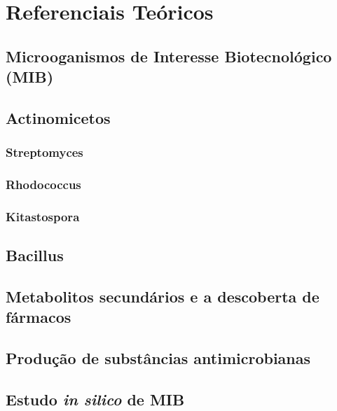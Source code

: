 \chapter{Referenciais Teóricos}
\label{cap:referenciais_teoricos}

\section{Microoganismos de Interesse Biotecnológico (MIB)}

\section{Actinomicetos}
\subsection{Streptomyces}
\subsection{Rhodococcus}
\subsection{Kitastospora}
\section{Bacillus}

\section{Metabolitos secundários e a descoberta de fármacos}
\section{Produção de substâncias antimicrobianas}
\section{Estudo \textit{in silico} de MIB}

